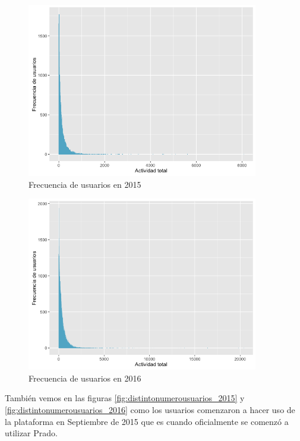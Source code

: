 \begin{figure}[H]
\centering
\includegraphics[width=0.9\textwidth]{../r/frecuenciausuarios_2015}
\caption{Frecuencia de usuarios en 2015}
\label{fig:frecuenciausuarios_2015}
\end{figure}


\begin{figure}[H]
\centering
\includegraphics[width=0.9\textwidth]{../r/frecuenciausuarios_2016}
\caption{Frecuencia de usuarios en 2016}
\label{fig:frecuenciausuarios_2016}
\end{figure}

También vemos en las figuras \ref{fig:distintonumerousuarios_2015} y \ref{fig:distintonumerousuarios_2016} como los usuarios comenzaron a hacer uso de la plataforma en Septiembre de 2015 que es cuando oficialmente se comenzó a utilizar Prado.



